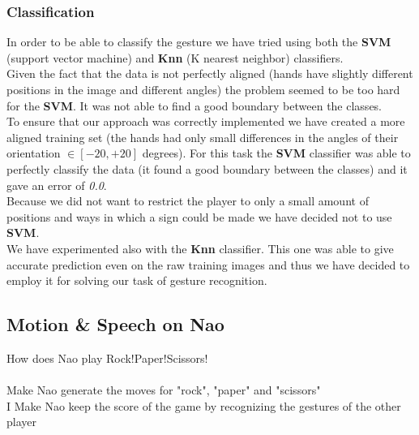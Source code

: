 \documentclass[a4paper, 11pt, twocolumn]{article}
\begin{document}
		\subsubsection{Classification}
		In order to be able to classify the gesture we have tried using both the \textbf{SVM} (support vector machine) and \textbf{Knn} (K nearest neighbor) classifiers.\\
		\hspace*{10px}Given the fact that the data is not perfectly aligned (hands have slightly different positions in the image and different angles) the problem seemed to be too hard for the \textbf{SVM}. It was not able to find a good boundary between the classes.\\
		\hspace*{10px}To ensure that our approach was correctly implemented we have created a more aligned training set (the hands had only small differences in the angles of their orientation $ \in [-20, +20]$ degrees). For this task the \textbf{SVM} classifier was able to perfectly classify the data (it found a good boundary between the classes) and it gave an error of \emph{0.0}.\\
		\hspace*{10px}Because we did not want to restrict the player to only a small amount of positions and ways in which a sign could be made we have decided not to use \textbf{SVM}.\\
		\hspace*{10px}We have experimented also with the \textbf{Knn} classifier. This one was able to give accurate prediction even on the raw training images and thus we have decided to employ it for solving our task of gesture recognition.
        \subsection{Motion \& Speech on Nao}
		\label{sec:Meth_naoPlay}
        How does Nao play Rock!Paper!Scissors!\\\\
        Make Nao generate the moves for "rock", "paper" and "scissors"\\
        I Make Nao keep the score of the game by recognizing the gestures of the
        other player
\end{document}
